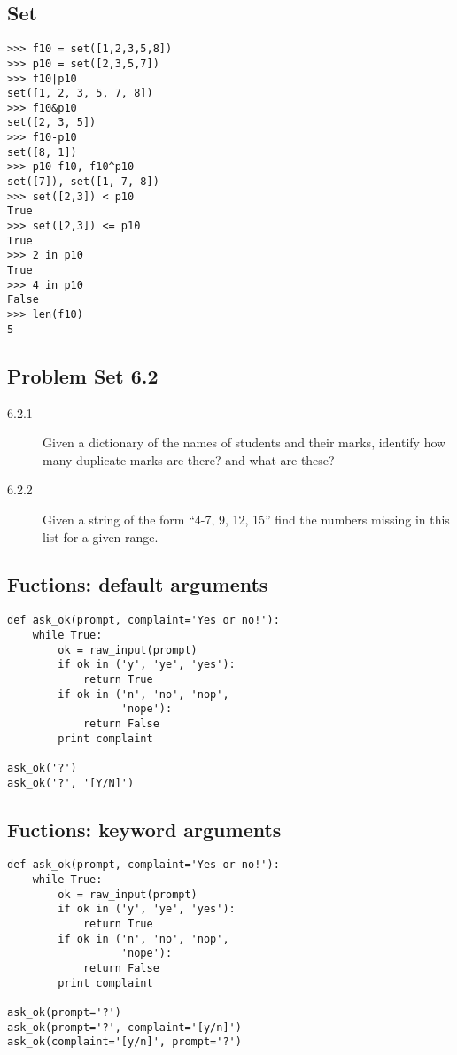 \documentclass[12pt]{article}
\begin{document}
\subsection{Set}
\begin{verbatim}
>>> f10 = set([1,2,3,5,8])
>>> p10 = set([2,3,5,7])
>>> f10|p10
set([1, 2, 3, 5, 7, 8])
>>> f10&p10
set([2, 3, 5])
>>> f10-p10
set([8, 1])
>>> p10-f10, f10^p10
set([7]), set([1, 7, 8])
>>> set([2,3]) < p10
True
>>> set([2,3]) <= p10
True
>>> 2 in p10
True
>>> 4 in p10
False
>>> len(f10)
5
\end{verbatim}

\subsection{Problem Set 6.2}
\begin{description}
  \item[6.2.1] Given a dictionary of the names of students and their marks, identify how many duplicate marks are there? and what are these?
  \item[6.2.2] Given a string of the form ``4-7, 9, 12, 15'' find the numbers missing in this list for a given range.
\end{description}
\subsection{Fuctions: default arguments}
\begin{verbatim}
def ask_ok(prompt, complaint='Yes or no!'):
    while True:
        ok = raw_input(prompt)
        if ok in ('y', 'ye', 'yes'): 
            return True
        if ok in ('n', 'no', 'nop',
                  'nope'): 
            return False
        print complaint

ask_ok('?')
ask_ok('?', '[Y/N]')
\end{verbatim}
\newpage
\subsection{Fuctions: keyword arguments}
\begin{verbatim}
def ask_ok(prompt, complaint='Yes or no!'):
    while True:
        ok = raw_input(prompt)
        if ok in ('y', 'ye', 'yes'): 
            return True
        if ok in ('n', 'no', 'nop',
                  'nope'): 
            return False
        print complaint

ask_ok(prompt='?')
ask_ok(prompt='?', complaint='[y/n]')
ask_ok(complaint='[y/n]', prompt='?')
\end{verbatim}
\end{document}
